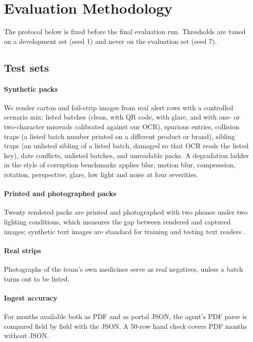 \section{Evaluation Methodology}
\label{sec:eval}

The protocol below is fixed before the final evaluation run. Thresholds are tuned on a development set (seed 1) and never on the evaluation set (seed 7).

\subsection{Test sets}
\paragraph{Synthetic packs}
We render carton and foil-strip images from real alert rows with a controlled scenario mix: listed batches (clean, with QR code, with glare, and with one- or two-character misreads calibrated against our OCR), spurious entries, collision traps (a listed batch number printed on a different product or brand), sibling traps (an unlisted sibling of a listed batch, damaged so that OCR reads the listed key), date conflicts, unlisted batches, and unreadable packs. A degradation ladder in the style of corruption benchmarks \cite{hendrycks2019benchmarking} applies blur, motion blur, compression, rotation, perspective, glare, low light and noise at four severities.

\paragraph{Printed and photographed packs}
Twenty rendered packs are printed and photographed with two phones under two lighting conditions, which measures the gap between rendered and captured images; synthetic text images are standard for training and testing text readers \cite{gupta2016synthtext}.

\paragraph{Real strips}
Photographs of the team's own medicines serve as real negatives, unless a batch turns out to be listed.

\paragraph{Ingest accuracy}
For months available both as PDF and as portal JSON, the agent's PDF parse is compared field by field with the JSON. A 50-row hand check covers PDF months without JSON.

